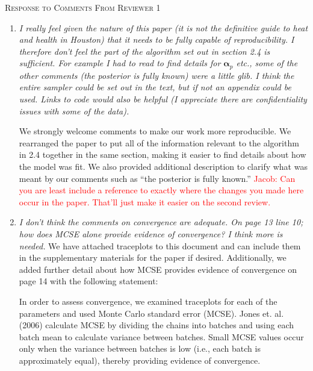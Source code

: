 \documentclass{article}
\begin{document}
\begin{center}{\large \textsc{Response to Comments From Reviewer 1}}\end{center}
\begin{enumerate}
  \item \textit{I really feel given the nature of this paper (it is not the definitive guide to heat and health in Houston) that it needs to be fully capable of reproducibility.   I therefore don't feel the part of the algorithm set out in section 2.4 is sufficient.   For example I had to read to find details for $\boldsymbol{\alpha}_p$ etc., some of the other comments (the posterior is fully known) were a little glib.   I think the entire sampler could be set out in the text, but if not an appendix could be used.   Links to code would also be helpful (I appreciate there are confidentiality issues with some of the data).}

We strongly welcome comments to make our work more reproducible. We rearranged the paper to put all of the information relevant to the algorithm in 2.4 together in the same section, making it easier to find details about how the model was fit. We also provided additional description to clarify what was meant by our comments such as ``the posterior is fully known.''  \textcolor{red}{Jacob: Can you are least include a reference to exactly where the changes you made here occur in the paper.  That'll just make it easier on the second review.}



\item\textit{I don't think the comments on convergence are adequate.   On page 13 line 10; how does MCSE alone provide evidence of convergence?   I think more is needed.}
We have attached traceplots to this document and can include them in the supplementary materials for the paper if desired. Additionally, we added further detail about how MCSE provides evidence of convergence on page 14 with the following statement:

\begin{displayquote}
In order to assess convergence, we examined traceplots for each of the parameters and used Monte Carlo standard error (MCSE). Jones et. al. (2006) calculate MCSE by dividing the chains into batches and using each batch mean to calculate variance between batches. Small MCSE values occur only when the variance between batches is low (i.e., each batch is approximately equal), thereby providing evidence of convergence.
\end{displayquote}


\end{enumerate}
\end{document}
